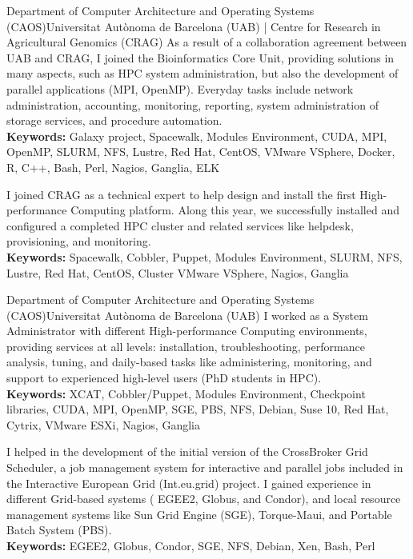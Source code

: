 {Department of Computer Architecture and Operating Systems (CAOS)}{Universitat Aut\`onoma de Barcelona (UAB) | Centre for Research in Agricultural Genomics (CRAG)}{}
{
As a result of a collaboration agreement between UAB and CRAG, I joined the Bioinformatics Core Unit, providing solutions in many aspects, such as HPC system administration, but also the development of parallel applications (MPI, OpenMP). Everyday tasks include network administration, accounting, monitoring, reporting, system administration of storage services, and procedure automation.
\medskip\\ 
\textbf{Keywords:} Galaxy project, Spacewalk, Modules Environment, CUDA, MPI, OpenMP, SLURM, NFS, Lustre, Red Hat, CentOS, VMware VSphere, Docker, R, C++, Bash, Perl, Nagios, Ganglia, ELK
\medskip}

{
I joined CRAG as a technical expert to help design and install the first High-performance Computing platform. Along this year, we successfully installed and configured a completed HPC cluster and related services like helpdesk, provisioning, and monitoring.
\medskip\\ 
\textbf{Keywords:} Spacewalk, Cobbler, Puppet, Modules Environment, SLURM, NFS, Lustre, Red Hat, CentOS, Cluster VMware VSphere, Nagios, Ganglia
\medskip}

{Department of Computer Architecture and Operating Systems (CAOS)}{Universitat Aut\`onoma de Barcelona (UAB)}{}
{
I worked as a System Administrator with different High-performance Computing environments, providing services at all levels: installation, troubleshooting, performance analysis, tuning, and daily-based tasks like administering, monitoring, and support to experienced high-level users (PhD students in HPC).
\medskip\\ 
\textbf{Keywords:} XCAT, Cobbler/Puppet, Modules Environment, Checkpoint libraries, CUDA, MPI, OpenMP, SGE, PBS, NFS, Debian, Suse 10, Red Hat, Cytrix, VMware ESXi, Nagios, Ganglia
\medskip}

{
I helped in the development of the initial version of the CrossBroker Grid Scheduler, a job management system for interactive and parallel jobs included in the Interactive European Grid (Int.eu.grid) project. I gained experience in different Grid-based systems ( EGEE2, Globus, and Condor), and local resource management systems like Sun Grid Engine (SGE), Torque-Maui, and Portable Batch System (PBS). 
\medskip\\ 
\textbf{Keywords:} EGEE2, Globus, Condor, SGE, NFS, Debian, Xen, Bash, Perl
\medskip}

